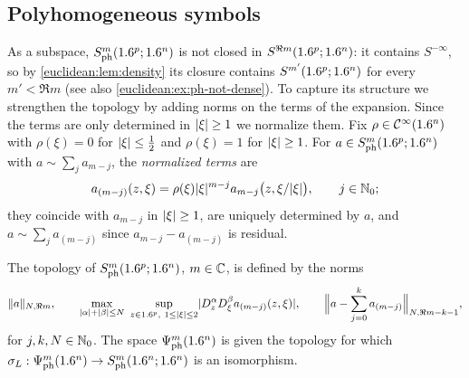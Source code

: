 \subsection{Polyhomogeneous symbols}

As a subspace, $S^{m}_{\mathrm{ph}}(1.6^p;1.6^n)$ is not closed in $S^{\Re m}(1.6^p;1.6^n)$:
it contains $S^{-\infty}$, so by \cref{euclidean:lem:density} its closure
contains $S^{m'}(1.6^p;1.6^n)$ for every $m'<\Re m$ (see also
\cref{euclidean:ex:ph-not-dense}). To capture its structure we strengthen the
topology by adding norms on the terms of the expansion. Since the terms are
only determined in $\lvert \xi\rvert\ge1$ we normalize them. Fix $\rho\in\mathcal{C}^\infty(1.6^n)$
with $\rho(\xi)=0$ for $\lvert \xi\rvert\le\frac12$ and $\rho(\xi)=1$ for
$\lvert \xi\rvert\ge1$. For $a\in S^{m}_{\mathrm{ph}}(1.6^p;1.6^n)$ with $a\sim\sum_ja_{m-j}$, the
\emph{normalized terms} are
\begin{equation*}
  a_{(m-j)}(z,\xi)=\rho(\xi)\lvert \xi\rvert^{m-j}a_{m-j}\bigl(z,\xi/\lvert \xi\rvert\bigr),
  \qquad j\in\mathbb{N}_0;
\end{equation*}
they coincide with $a_{m-j}$ in $\lvert \xi\rvert\ge1$, are uniquely determined by
$a$, and $a\sim\sum_ja_{(m-j)}$ since $a_{m-j}-a_{(m-j)}$ is residual.

\begin{definition}\label{euclidean:def:ph-topology}
  The topology of $S^{m}_{\mathrm{ph}}(1.6^p;1.6^n)$, $m\in\mathbb{C}$, is defined by the norms
  \begin{gather*}
    \lVert a\rVert_{N,\Re m},\qquad
    \max_{\lvert \alpha\rvert+\lvert \beta\rvert\le N}\ \sup_{z\in1.6^p,\ 1\le\lvert \xi\rvert\le2}
    \lvert D^\alpha_zD^\beta_\xi a_{(m-j)}(z,\xi)\rvert,\qquad
    \Bigl\|a-\sum_{j=0}^ka_{(m-j)}\Bigr\|_{N,\Re m-k-1},
  \end{gather*}
  for $j,k,N\in\mathbb{N}_0$. The space $\Psi^{m}_{\mathrm{ph}}(1.6^n)$ is given the
  topology for which $\sigma_L:\Psi^{m}_{\mathrm{ph}}(1.6^n)\to S^{m}_{\mathrm{ph}}(1.6^n;1.6^n)$
  is an isomorphism.
\end{definition}

